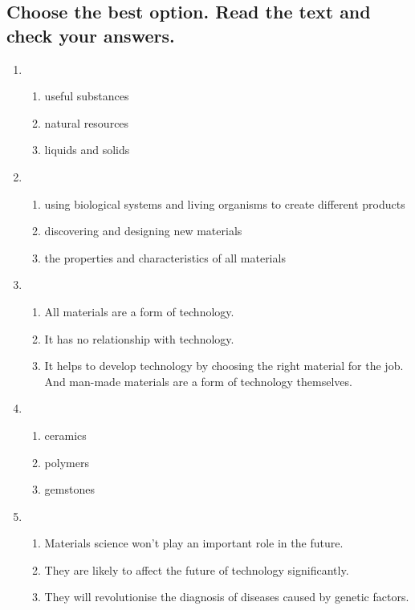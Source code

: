 \subsection*{Choose the best option. Read the text and check your answers.}
\begin{enumerate}
      \item {}
            \begin{enumerate}
                  \item useful substances
                  \item natural resources
                  \item liquids and solids
            \end{enumerate}
      \item {}
            \begin{enumerate}
                  \item using biological systems and living organisms to create different products
                  \item discovering and designing new materials
                  \item the properties and characteristics of all materials
            \end{enumerate}
      \item {}
            \begin{enumerate}
                  \item All materials are a form of technology.
                  \item It has no relationship with technology.
                  \item It helps to develop technology by choosing the right material for the job. And man-made materials are a form of technology themselves.
            \end{enumerate}
      \item {}
            \begin{enumerate}
                  \item ceramics
                  \item polymers
                  \item gemstones
            \end{enumerate}
      \item {}
            \begin{enumerate}
                  \item Materials science won’t play an important role in the future.
                  \item They are likely to affect the future of technology significantly.
                  \item They will revolutionise the diagnosis of diseases caused by genetic factors.
            \end{enumerate}
\end{enumerate}

